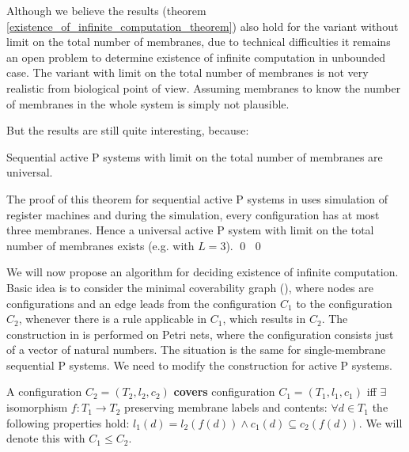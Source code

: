 
Although we believe the results (theorem \ref{existence_of_infinite_computation_theorem}) also hold for the variant without limit on the total number of membranes, due to technical difficulties it remains an open problem to determine existence of infinite computation in unbounded case.
The variant with limit on the total number of membranes is not very realistic from biological point of view. Assuming membranes to know the number of membranes in the whole system is simply not plausible.

But the results are still quite interesting, because:

\begin{veta}
  Sequential active P systems with limit on the total number of membranes are universal.
\end{veta}

\begin{dokaz}
  The proof of this theorem for sequential active P systems in \cite{Ibarra05Active} uses simulation of register machines and during the simulation, every configuration has at most three membranes. Hence a universal active P system with limit on the total number of membranes exists (e.g. with $L=3$). \qed
  \qed
\end{dokaz}

We will now propose an algorithm for deciding existence of infinite computation. Basic idea is to consider the minimal coverability graph (\cite{Rozenberg93MinimalCoverabilityGraph}), where nodes are configurations and an edge leads from the configuration $C_1$ to the configuration $C_2$, whenever there is a rule applicable in $C_1$, which results in $C_2$. The construction in \cite{Rozenberg93MinimalCoverabilityGraph} is performed on Petri nets, where the configuration consists just of a vector of natural numbers. The situation is the same for single-membrane sequential P systems. We need to modify the construction for active P systems.

\begin{definition}
  A configuration $C_2 = (T_2, l_2, c_2)$ {\bf covers} configuration $C_1 = (T_1, l_1, c_1)$ iff $\exists$ isomorphism $f: T_1\rightarrow T_2$ preserving membrane labels and contents: $\forall d\in T_1$ the following properties hold: $l_1(d)=l_2(f(d))\wedge c_1(d)\subseteq c_2(f(d))$. We will denote this with $C_1\leq C_2$.
\end{definition}

